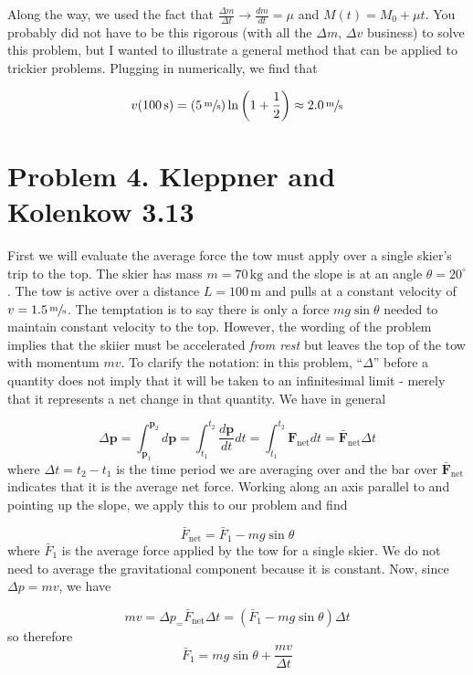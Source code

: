\documentclass[11pt]{article}
\begin{document}
Along the way, we used the fact that $\frac{\Delta m}{\Delta t} \rightarrow \frac{dm}{dt} = \mu$ and $M(t) = M_0 + \mu t$. You probably did not have to be this rigorous (with all the $\Delta m$, $\Delta v$ business) to solve this problem, but I wanted to illustrate a general method that can be applied to trickier problems. Plugging in numerically, we find that

$$v(100 \, \textrm{s}) = (5 \, \sfrac{\textrm{m}}{\textrm{s}}) \ln{\left(1 + \frac{1}{2} \right)} \approx 2.0 \, \sfrac{\textrm{m}}{\textrm{s}}$$

\section*{Problem 4. Kleppner and Kolenkow 3.13}

First we will evaluate the average force the tow must apply over a single skier's trip to the top. The skier has mass $m = 70 \, \textrm{kg}$ and the slope is at an angle $\theta = 20^\circ$. The tow is active over a distance $L = 100 \, \textrm{m}$ and pulls at a constant velocity of $v = 1.5 \, \sfrac{\textrm{m}}{\textrm{s}}$. The temptation is to say there is only a force $mg \sin \theta$ needed to maintain constant velocity to the top. However, the wording of the problem implies that the skiier must be accelerated \emph{from rest} but leaves the top of the tow with momentum $mv$. To clarify the notation: in this problem, ``$\Delta$'' before a quantity does not imply that it will be taken to an infinitesimal limit - merely that it represents a net change in that quantity. We have in general

$$\Delta \mathbf{p} = \int_{\mathbf{p}_1}^{\mathbf{p}_2} d\mathbf{p} = \int_{t_1}^{t_2} \frac{d\mathbf{p}}{dt} dt = \int_{t_1}^{t_2} \mathbf{F}_{\textrm{net}} dt = \bar{\mathbf{F}}_{\textrm{net}} \Delta t$$
where $\Delta t = t_2 - t_1$ is the time period we are averaging over and the bar over $\bar{\mathbf{F}}_{\textrm{net}}$ indicates that it is the average net force. Working along an axis parallel to and pointing up the slope, we apply this to our problem and find

$$\bar{F}_{\textrm{net}} = \bar{F}_{1} - mg \sin{\theta}$$
where $\bar{F}_{1}$ is the average force applied by the tow for a single skier. We do not need to average the gravitational component because it is constant. Now, since $\Delta p = mv$, we have

$$mv = \Delta p_ = \bar{F}_{\textrm{net}} \Delta t = (\bar{F}_{1} - mg \sin{\theta}) \Delta t$$
so therefore
$$\bar{F}_{1} = mg \sin{\theta} + \frac{mv}{\Delta t}$$
\end{document}
